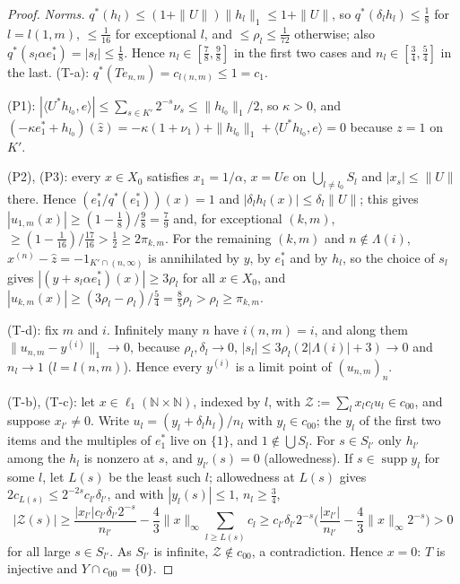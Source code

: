 \documentclass[10pt]{amsart}
\theoremstyle{definition}
\theoremstyle{remark}
\newcommand{\supp}{\operatorname{supp}}
\newcommand{\N}{\mathbb N}
\newcommand{\zh}{\hat z}
\newcommand{\ip}[2]{\langle #1,#2\rangle}
\begin{document}
\begin{proof}
\emph{Norms.}  $q^*(h_l)\le(1+\|U\|)\|h_l\|_1\le1+\|U\|$, so
$q^*(\delta_lh_l)\le\frac18$ for $l=l(1,m)$, $\le\frac1{16}$ for exceptional
$l$, and $\le\rho_l\le\frac1{72}$ otherwise; also $q^*(s_l\alpha e_1^*)=
|s_l|\le\frac18$.  Hence $n_l\in[\frac78,\frac98]$ in the first two cases and
$n_l\in[\frac34,\frac54]$ in the last.  (T-a): $q^*(Te_{n,m})=c_{l(n,m)}\le1
=c_1$.

(P1): $|\ip{U^*h_{l_0}}{e}|\le\sum_{s\in K'}2^{-s}\nu_s\le\|h_{l_0}\|_1/2$, so
$\kappa>0$, and $(-\kappa e_1^*+h_{l_0})(\zh)=-\kappa(1+\nu_1)+\|h_{l_0}\|_1+
\ip{U^*h_{l_0}}{e}=0$ because $z=1$ on $K'$.

(P2), (P3): every $x\in X_0$ satisfies $x_1=1/\alpha$, $x=Ue$ on
$\bigcup_{l\ne l_0}S_l$ and $|x_s|\le\|U\|$ there.  Hence
$(e_1^*/q^*(e_1^*))(x)=1$ and $|\delta_lh_l(x)|\le\delta_l\|U\|$; this gives
$|u_{1,m}(x)|\ge(1-\frac18)/\frac98=\frac79$ and, for exceptional $(k,m)$,
$\ge(1-\frac1{16})/\frac{17}{16}>\frac12\ge2\pi_{k,m}$.  For the remaining
$(k,m)$ and $n\notin\Lambda(i)$, $x^{(n)}-\zh=-1_{K'\cap(n,\infty)}$ is
annihilated by $y$, by $e_1^*$ and by $h_l$, so the choice of $s_l$ gives
$|(y+s_l\alpha e_1^*)(x)|\ge3\rho_l$ for all $x\in X_0$, and
$|u_{k,m}(x)|\ge(3\rho_l-\rho_l)/\frac54=\frac85\rho_l>\rho_l\ge\pi_{k,m}$.

(T-d): fix $m$ and $i$.  Infinitely many $n$ have $i(n,m)=i$, and along
them $\|u_{n,m}-y^{(i)}\|_1\to0$, because $\rho_l,\delta_l\to0$,
$|s_l|\le3\rho_l(2|\Lambda(i)|+3)\to0$ and $n_l\to1$ ($l=l(n,m)$).  Hence
every $y^{(i)}$ is a limit point of $(u_{n,m})_n$.

(T-b), (T-c): let $x\in\ell_1(\N\times\N)$, indexed by $l$, with
$\mathcal Z:=\sum_lx_lc_lu_l\in c_{00}$, and suppose $x_{l'}\ne0$.  Write
$u_l=(y_l+\delta_lh_l)/n_l$ with $y_l\in c_{00}$; the $y_l$ of the first
two items and the multiples of $e_1^*$ live on $\{1\}$, and
$1\notin\bigcup S_l$.  For $s\in S_{l'}$ only $h_{l'}$ among the $h_l$ is
nonzero at $s$, and $y_{l'}(s)=0$ (allowedness).  If $s\in\supp y_l$ for
some $l$, let $L(s)$ be the least such $l$; allowedness at $L(s)$ gives
$2c_{L(s)}\le2^{-2s}c_{l'}\delta_{l'}$, and with $|y_l(s)|\le1$,
$n_l\ge\frac34$,
\[
 |\mathcal Z(s)|\ge\frac{|x_{l'}|c_{l'}\delta_{l'}2^{-s}}{n_{l'}}-\frac43
 \|x\|_\infty\sum_{l\ge L(s)}c_l\ge c_{l'}\delta_{l'}2^{-s}
 \Big(\frac{|x_{l'}|}{n_{l'}}-\frac43\|x\|_\infty2^{-s}\Big)>0
\]
for all large $s\in S_{l'}$.  As $S_{l'}$ is infinite, $\mathcal Z\notin c_{00}$,
a contradiction.  Hence $x=0$: $T$ is injective and $Y\cap c_{00}=\{0\}$.
\end{proof}
\end{document}
